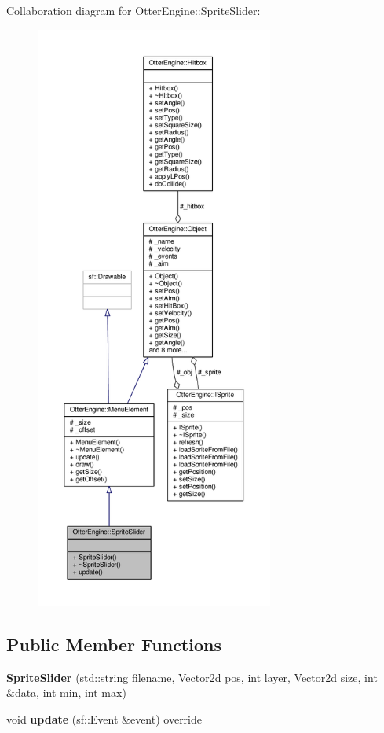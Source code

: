 Collaboration diagram for Otter\+Engine\+:\+:Sprite\+Slider\+:\nopagebreak
\begin{figure}[H]
\begin{center}
\leavevmode
\includegraphics[height=550pt]{d2/de9/class_otter_engine_1_1_sprite_slider__coll__graph}
\end{center}
\end{figure}
\subsection*{Public Member Functions}
\begin{DoxyCompactItemize}
\item 
{\bfseries Sprite\+Slider} (std\+::string filename, Vector2d pos, int layer, Vector2d size, int \&data, int min, int max)\hypertarget{class_otter_engine_1_1_sprite_slider_a534983d0d0c3fda38543457a027d7df9}{}\label{class_otter_engine_1_1_sprite_slider_a534983d0d0c3fda38543457a027d7df9}

\item 
void {\bfseries update} (sf\+::\+Event \&event) override\hypertarget{class_otter_engine_1_1_sprite_slider_a567f174c5034ab0a8c9ebb099db69f86}{}\label{class_otter_engine_1_1_sprite_slider_a567f174c5034ab0a8c9ebb099db69f86}

\end{DoxyCompactItemize}
